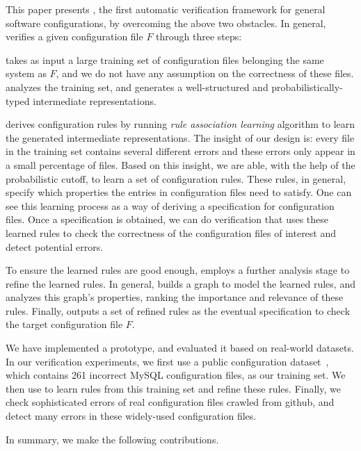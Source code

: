 This paper presents \app, the first automatic verification framework
for general software configurations, by overcoming the above two
obstacles. In general, \app verifies a given configuration file $F$ 
through three steps:

\app takes as input a large training set of configuration files
belonging the same system as $F$,
and we do not have any assumption on the correctness of these files.
\app analyzes the training set, and generates a well-structured and
probabilistically-typed intermediate representations.

\app derives configuration rules by running {\em rule association
learning} algorithm to learn the generated intermediate representations.
The insight of our design is: every file in the training set
contains several different errors and these errors only appear 
in a small percentage of files. Based on this insight,
we are able, with the help of the probabilistic cutoff, to learn a
set of configuration rules. These rules, in general, specify 
which properties the entries in configuration files need to satisfy. 
One can see this learning process as a way of deriving  
a specification for configuration files.  
Once a specification is obtained, we can do verification that 
uses these learned rules to check the correctness of 
the configuration files
of interest and detect potential errors.

To ensure the learned rules are good enough,
\app employs a further analysis stage to refine the learned rules.
In general, \app builds a graph to model the learned rules,
and analyzes this graph's properties, ranking the importance
and relevance of these rules. Finally, \app outputs
a set of refined rules as the eventual specification
to check the target configuration file $F$.

We have implemented a \app prototype, and evaluated it based on
real-world datasets. In our verification experiments, 
we first use a public configuration dataset~\cite{configdataset}, which
contains 261 incorrect MySQL configuration files, as our
training set. We then use \app to learn rules from this training set
and refine these rules. Finally, we check sophisticated 
errors of real configuration files crawled from github,
and detect many errors in these widely-used configuration files.

In summary, we make the following contributions.


